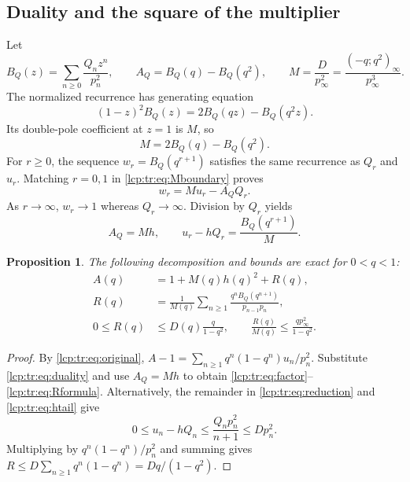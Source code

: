 \documentclass[11pt]{article}
\numberwithin{equation}{section}
\newtheorem{proposition}[theorem]{Proposition}
\theoremstyle{definition}\newtheorem{definition}[theorem]{Definition}
\theoremstyle{remark}\newtheorem{remark}[theorem]{Remark}
\begin{document}
\subsection{Duality and the square of the multiplier}
Let
\[
 B_Q(z)=\sum_{n\ge0}\frac{Q_nz^n}{p_n^2},\qquad
 A_Q=B_Q(q)-B_Q(q^2),\qquad
 M=\frac{D}{p_\infty^2}=\frac{(-q;q^2)_\infty}{p_\infty^3}.
\]
The normalized recurrence has generating equation
\begin{equation}\label{lcp:tr:eq:BQ}
 (1-z)^2B_Q(z)=2B_Q(qz)-B_Q(q^2z).
\end{equation}
Its double-pole coefficient at $z=1$ is $M$, so
\begin{equation}\label{lcp:tr:eq:Mboundary}
 M=2B_Q(q)-B_Q(q^2).
\end{equation}
For $r\ge0$, the sequence $w_r=B_Q(q^{r+1})$ satisfies the same recurrence as $Q_r$ and $u_r$. Matching $r=0,1$ in \eqref{lcp:tr:eq:Mboundary} proves
\[
 w_r=M u_r-A_QQ_r.
\]
As $r\to\infty$, $w_r\to1$ whereas $Q_r\to\infty$. Division by $Q_r$ yields
\begin{equation}\label{lcp:tr:eq:duality}
 A_Q=Mh,\qquad u_r-hQ_r=\frac{B_Q(q^{r+1})}{M}.
\end{equation}

\begin{proposition}\label{lcp:tr:prop:factor}
The following decomposition and bounds are exact for $0<q<1$:
\begin{align}
 A(q)&=1+M(q)h(q)^2+R(q),\label{lcp:tr:eq:factor}\\
 R(q)&=\frac{1}{M(q)}\sum_{n\ge1}
       \frac{q^nB_Q(q^{n+1})}{p_{n-1}p_n},\label{lcp:tr:eq:Rformula}\\
 0\le R(q)&\le D(q)\frac{q}{1-q^2},\qquad
 \frac{R(q)}{M(q)}\le\frac{q p_\infty^2}{1-q^2}.\label{lcp:tr:eq:Rbound}
\end{align}
\end{proposition}
\begin{proof}
By \eqref{lcp:tr:eq:original},
$A-1=\sum_{n\ge1}q^n(1-q^n)u_n/p_n^2$.
Substitute \eqref{lcp:tr:eq:duality} and use $A_Q=Mh$ to obtain \eqref{lcp:tr:eq:factor}--\eqref{lcp:tr:eq:Rformula}. Alternatively, the remainder in \eqref{lcp:tr:eq:reduction} and \eqref{lcp:tr:eq:htail} give
\[
 0\le u_n-hQ_n\le\frac{Q_np_n^2}{n+1}\le Dp_n^2.
\]
Multiplying by $q^n(1-q^n)/p_n^2$ and summing gives
$R\le D\sum_{n\ge1}q^n(1-q^n)=Dq/(1-q^2)$.
\end{proof}
\end{document}
